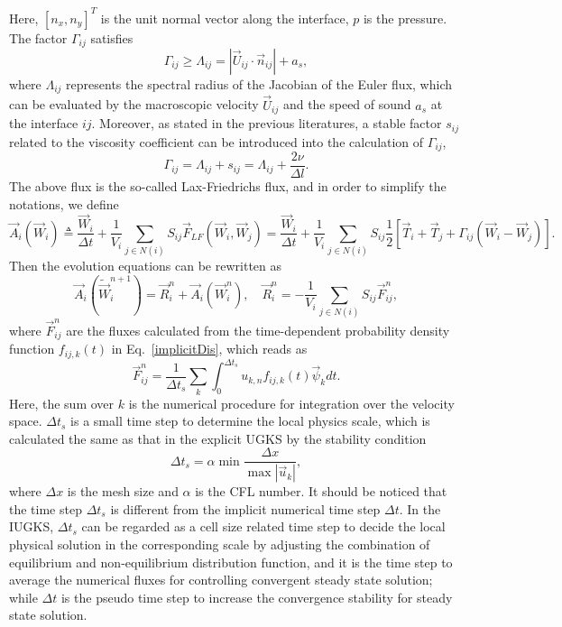 \documentclass[3p,12pt]{elsarticle}
\begin{document}
	Here, $\left[n_x,n_y\right]^{T}$ is the unit normal vector along the interface, $p$ is the pressure. The factor $\Gamma_{ij}$ satisfies
	\begin{equation}
		\Gamma_{ij} \geq \Lambda_{i j} =\left|\vec{U}_{i j} \cdot \vec{n}_{i j}\right|+a_{s},
	\end{equation}
	where $\Lambda_{ij}$ represents the spectral radius of the Jacobian of the Euler flux, which can be evaluated by the macroscopic velocity $\vec{U}_{ij}$ and the speed of sound $a_s$ at the interface $ij$. Moreover, as stated in the previous literatures, a stable factor $s_{ij}$ related to the viscosity coefficient can be introduced into the calculation of $\Gamma_{ij}$,
	\begin{equation}
		\Gamma_{ij} = \Lambda_{ij} + s_{ij} = \Lambda_{ij} + \frac{2 \nu }{\Delta l}.
	\end{equation}
	The above flux is the so-called Lax-Friedrichs flux, and in order to simplify the notations, we define $$\vec{A}_i\left(\vec{W}_i\right) \triangleq  \frac{\vec{W}_i}{\Delta t} +\frac{1}{V_i}\sum_{j\in N(i)}S_{ij} \vec{F}_{LF}\left(\vec{W}_i,\vec{W}_j\right) = \frac{\vec{W}_i}{\Delta t} +\frac{1}{V_i}\sum_{j\in N(i)}S_{ij}  \frac{1}{2} \left[ \vec{T}_i +  \vec{T}_j + \Gamma_{ij} \left( \vec{W}_i- \vec{W}_j\right)\right].$$
	Then the evolution equations can be rewritten as
	\begin{equation}
		\vec{A}_i\left( \tilde{\vec{W}}_{i}^{n+1}\right) =\vec{R}_i^n +  \vec{A}_i\left( \vec{W}_{i}^{n}\right) , \quad \vec{R}_i^n = -\frac{1}{V_i}\sum_{j\in N(i)}S_{ij}\vec{F}^n_{ij},
		\label{nonlinear}\end{equation}
	where $\vec{F}^n_{ij}$ are the fluxes calculated from the time-dependent probability density function $f_{ij,k}(t)$ in Eq.~\eqref{implicitDis}, which reads as
	\begin{equation}
		\vec{F}^n_{ij} = \frac{1}{\Delta t_s}\sum_k \int_0^{\Delta t_s} u_{k,n}f_{ij,k}(t)\vec{\psi}_{k}dt.
	\end{equation}
	Here, the sum over $k$ is the numerical procedure for integration over the velocity space.
	$\Delta t_s$ is a small time step to determine the local physics scale, which is calculated the same as that in the explicit UGKS by the stability condition
	\begin{equation}
		\Delta t_s = \alpha \min \frac{\Delta x}{\max |\vec{u}_k|},
	\end{equation}
	where $\Delta x$ is the mesh size and $\alpha$ is the CFL number.
	It should be noticed that the time step $\Delta t_s$ is different from the implicit numerical time step $\Delta t$.
	In the IUGKS, $\Delta t_s$ can be regarded as a cell size related time step to decide the local physical solution in the corresponding scale by adjusting the combination of equilibrium and non-equilibrium distribution function, and it is the time step to average the numerical fluxes for controlling convergent steady state solution; while $\Delta t$ is the pseudo time step to increase the convergence stability for steady state solution.
	
\end{document}
